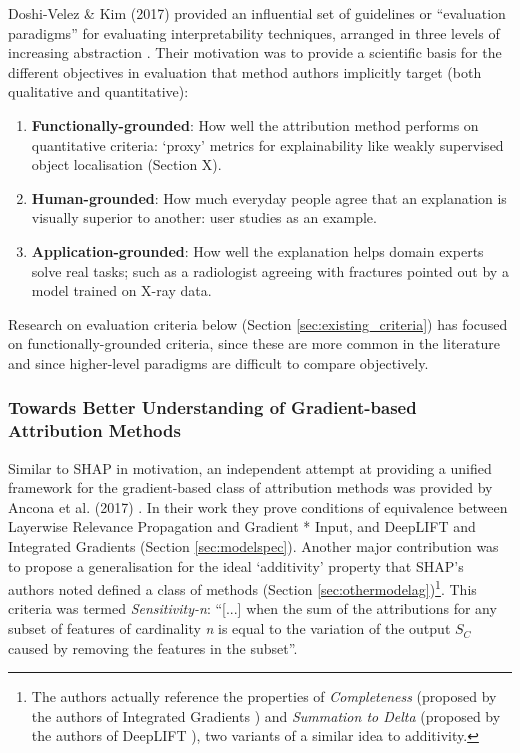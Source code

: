 \documentclass[main]{subfiles}
\begin{document}
Doshi-Velez \& Kim (2017) provided an influential set of guidelines or ``evaluation paradigms'' for evaluating interpretability techniques, arranged in three levels of increasing abstraction \cite{paradigms}. Their motivation was to provide a scientific basis for the different objectives in evaluation that method authors implicitly target (both qualitative and quantitative):

\begin{enumerate}
\item \textbf{Functionally-grounded}: How well the attribution method performs on quantitative criteria: `proxy' metrics for explainability like weakly supervised object localisation (Section X).
\item \textbf{Human-grounded}: How much everyday people agree that an explanation is visually superior to another: user studies as an example.
\item \textbf{Application-grounded}: How well the explanation helps domain experts solve real tasks; such as a radiologist agreeing with fractures pointed out by a model trained on X-ray data.

\end{enumerate}

Research on evaluation criteria below (Section \ref{sec:existing_criteria}) has focused on functionally-grounded criteria, since these are more common in the literature and since higher-level paradigms are difficult to compare objectively.

\subsubsection{Towards Better Understanding of Gradient-based Attribution Methods \cite{ancona}}
Similar to SHAP in motivation, an independent attempt at providing a unified framework for the gradient-based class of attribution methods was provided by Ancona et al. (2017) \cite{ancona}. In their work they prove conditions of equivalence between Layerwise Relevance Propagation and Gradient * Input, and DeepLIFT and Integrated Gradients (Section \ref{sec:modelspec}). Another major contribution was to propose a generalisation for the ideal `additivity' property that SHAP's authors noted defined a class of methods (Section \ref{sec:othermodelag})\footnote{The authors actually reference the properties of \textit{Completeness} (proposed by the authors of Integrated Gradients \cite{integrated}) and \textit{Summation to Delta} (proposed by the authors of DeepLIFT \cite{deeplift}), two variants of a similar idea to additivity.}. This criteria was termed \textit{Sensitivity-n}: ``[...] when the sum of the attributions for any subset of features of cardinality \textit{n} is equal to the variation of the output $S_{C}$ caused by removing the features in the subset''.
\end{document}
